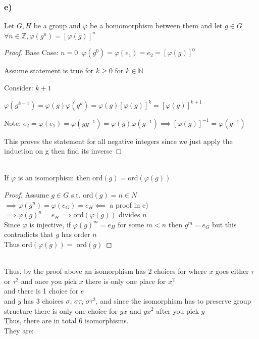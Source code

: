 \documentclass[12pt, letterpaper]{article}
\theoremstyle{definition}
\newcommand{\Z}{\mathbb{Z}}
\newcommand{\N}{\mathbb{N}}
\begin{document}
\subsubsection*{e)}
Let $G,H$ be a group and $\varphi$ be a homomorphism between them and let $g\in G$
$\forall n \in \Z, \varphi(g^n)=[\varphi(g)]^n$
\begin{proof}
    Base Case: $n=0\;\; \varphi(g^0)=\varphi(e_1)=e_2=[\varphi(g)]^0$

    Assume statement is true for $k\geq0$ for $k \in \N$

    Consider: $k+1$

    $\varphi(g^{k+1})=\varphi(g)\varphi(g^k)=\varphi(g)[\varphi(g)]^k=[\varphi(g)]^{k+1}$

    Note: $e_2=\varphi(e_1)=\varphi(gg^{-1})=\varphi(g)\varphi(g^{-1})\implies [\varphi(g)]^{-1}=\varphi(g^{-1})$

    This proves the statement for all negative integers since we just apply the induction on g then find its inverse
\end{proof}
\phantom{text}\\
If $\varphi$ is an isomorphism then ord$(g)=\text{ord}(\varphi(g))$
\begin{proof}
    Assume $g\in G$ s.t. ord$(g)=n \in N$\\
    $\implies \varphi(g^n)=\varphi(e_G)=e_H \impliedby$ a proof in c)\\
    $\implies \varphi(g)^n=e_H \implies \text{ord}(\varphi(g))$ divides $n$\\
    Since $\varphi$ is injective, if $\varphi(g)^m=e_H$ for some $m<n$ then $g^m=e_G$
    but this contradicts that $g$ has order $n$\\
    Thus ord$(\varphi(g))=$ ord$(g)$
\end{proof}
\phantom{text}\\
Thus, by the proof above an isomorphism has 2 choices
for where $x$ goes either $\tau$ or $\tau^2$ and once you pick $x$ there is only one place for $x^2$\\
and there is 1 choice for $e$\\
and $y$ has 3 choices $\sigma$, $\sigma\tau$, $\sigma\tau^2$, and since
the isomorphism has to preserve group structure there is only one choice for $yx$ and $yx^2$ after you pick $y$\\
Thus, there are in total 6 isomorphisms.\\
They are:
\newpage
\end{document}
